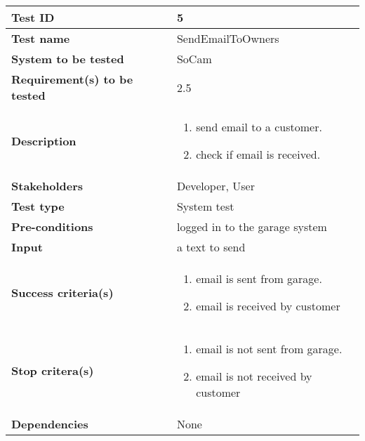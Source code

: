 		\begin{table}[H]
			\begin{tabular}{| p{4cm} | p{10cm} |}
			\hline
			\rowcolor{gray}
				{\bf Test ID} & 5 \\ \hline
				{\bf Test name} & SendEmailToOwners \\ \hline
				{\bf System to be tested} & SoCam \\ \hline
				{\bf Requirement(s) to be tested} & 2.5 \\ \hline
				{\bf Description} & 
					\begin{enumerate}
						\item send email to a customer.
						\item check if email is received.
					\end{enumerate}
				\\ \hline
				{\bf Stakeholders} & Developer, User \\ \hline
				{\bf Test type} & System test \\ \hline
				{\bf Pre-conditions} & logged in to the garage system \\ \hline
				{\bf Input} & a text to send \\ \hline
				{\bf Success criteria(s)} & 
					\begin{enumerate}
						\item email is sent from garage.
						\item email is received by customer
					\end{enumerate}
				\\ \hline
				{\bf Stop critera(s)} &  
					\begin{enumerate}
						\item email is not sent from garage.
						\item email is not  received by customer
					\end{enumerate} \\ \hline
				{\bf Dependencies} & None\\ \hline
			\end{tabular}
		\end{table}

